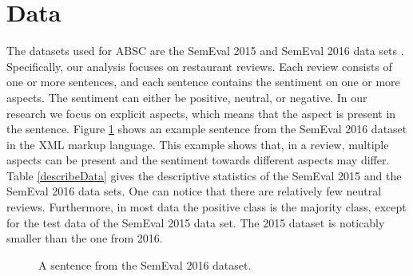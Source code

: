 \section{Data}
\label{sec:data}



The datasets used for ABSC are the SemEval 2015 \cite{SemEval2015} and SemEval 2016 data sets \cite{SemEval2016}. Specifically, our analysis focuses on restaurant reviews. Each review consists of one or more sentences, and each sentence contains the sentiment on one or more aspects. The sentiment can either be positive, neutral, or negative. In our research we focus on explicit aspects, which means that the aspect is present in the sentence. Figure \ref{fig:xml} shows an example sentence from the SemEval 2016 dataset in the XML markup language. This example shows that, in a review, multiple aspects can be present and the sentiment towards different aspects may differ. Table \ref{describeData} gives the descriptive statistics of the SemEval 2015 and the SemEval 2016 data sets. One can notice that there are relatively few neutral reviews. Furthermore, in most data the positive class is the majority class, except for the test data of the SemEval 2015 data set. The 2015 dataset is noticably smaller than the one from 2016.


\begin{figure}
    \centering
    \caption{A sentence from the SemEval 2016 dataset.}
    \label{fig:xml}
\end{figure}


